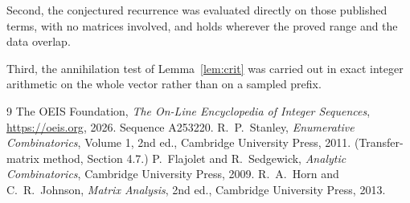 \documentclass[11pt,a4paper]{article}
\theoremstyle{plain}
\theoremstyle{definition}
\begin{document}
Second, the conjectured recurrence was evaluated directly on those published terms, with no
matrices involved, and holds wherever the proved range and the data overlap.

Third, the annihilation test of Lemma~\ref{lem:crit} was carried out in exact integer
arithmetic on the whole vector rather than on a sampled prefix.

\begin{thebibliography}{9}
 The OEIS Foundation, \emph{The On-Line Encyclopedia of Integer
Sequences}, \url{https://oeis.org}, 2026. Sequence A253220.
 R.~P.~Stanley, \emph{Enumerative Combinatorics}, Volume 1, 2nd ed.,
Cambridge University Press, 2011. (Transfer-matrix method, Section 4.7.)
 P.~Flajolet and R.~Sedgewick, \emph{Analytic Combinatorics}, Cambridge
University Press, 2009.
 R.~A.~Horn and C.~R.~Johnson, \emph{Matrix Analysis}, 2nd ed., Cambridge
University Press, 2013.
\end{thebibliography}
\end{document}
